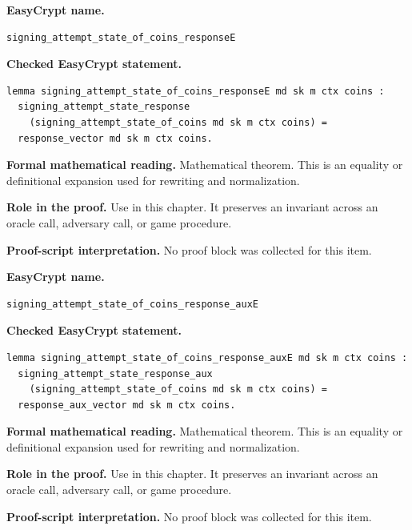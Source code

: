 \begin{formaltheorem}
\noindent\textbf{EasyCrypt name.}
\begin{lstlisting}[language=EasyCrypt,basicstyle=\ttfamily\scriptsize]
signing_attempt_state_of_coins_responseE
\end{lstlisting}
\noindent\textbf{Checked EasyCrypt statement.}
\begin{lstlisting}[language=EasyCrypt,basicstyle=\ttfamily\scriptsize]
lemma signing_attempt_state_of_coins_responseE md sk m ctx coins :
  signing_attempt_state_response
    (signing_attempt_state_of_coins md sk m ctx coins) =
  response_vector md sk m ctx coins.
\end{lstlisting}
\noindent\textbf{Formal mathematical reading.}
Mathematical theorem. This is an equality or definitional expansion used for rewriting and normalization.

\noindent\textbf{Role in the proof.}
Use in this chapter. It preserves an invariant across an oracle call, adversary call, or game procedure.

\noindent\textbf{Proof-script interpretation.}
No proof block was collected for this item.

\end{formaltheorem}

\begin{formaltheorem}
\noindent\textbf{EasyCrypt name.}
\begin{lstlisting}[language=EasyCrypt,basicstyle=\ttfamily\scriptsize]
signing_attempt_state_of_coins_response_auxE
\end{lstlisting}
\noindent\textbf{Checked EasyCrypt statement.}
\begin{lstlisting}[language=EasyCrypt,basicstyle=\ttfamily\scriptsize]
lemma signing_attempt_state_of_coins_response_auxE md sk m ctx coins :
  signing_attempt_state_response_aux
    (signing_attempt_state_of_coins md sk m ctx coins) =
  response_aux_vector md sk m ctx coins.
\end{lstlisting}
\noindent\textbf{Formal mathematical reading.}
Mathematical theorem. This is an equality or definitional expansion used for rewriting and normalization.

\noindent\textbf{Role in the proof.}
Use in this chapter. It preserves an invariant across an oracle call, adversary call, or game procedure.

\noindent\textbf{Proof-script interpretation.}
No proof block was collected for this item.

\end{formaltheorem}

